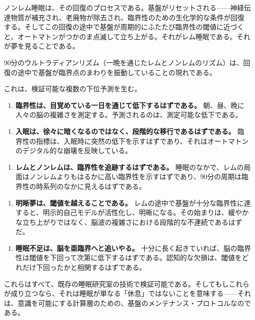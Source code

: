 \documentclass[11pt, twoside, openright]{book}
\begin{document}
ノンレム睡眠は、その回復のプロセスである。基盤がリセットされる------神経伝達物質が補充され、老廃物が除去され、臨界性のための生化学的な条件が回復する。そしてこの回復の途中で基盤が周期的にふたたび臨界性の閾値に近づくと、オートマトンがつかのま点滅して立ち上がる。それがレム睡眠である。それが夢を見ることである。

90分のウルトラディアンリズム（一晩を通じたレムとノンレムのリズム）は、回復の途中で基盤が臨界点のまわりを振動していることの現れである。

これは、検証可能な複数の下位予測を生む。

\begin{enumerate}
  \item \textbf{臨界性は、目覚めている一日を通じて低下するはずである。} 朝、昼、晩に人々の脳の複雑さを測定する。予測されるのは、測定可能な低下である。
\end{enumerate}

\begin{enumerate}
  \item \textbf{入眠は、徐々に暗くなるのではなく、段階的な移行であるはずである。} 臨界性の指標は、入眠時に突然の低下を示すはずであり、それはオートマトンのデジタル的な崩壊を反映している。
\end{enumerate}

\begin{enumerate}
  \item \textbf{レムとノンレムは、臨界性を追跡するはずである。} 睡眠のなかで、レムの局面はノンレムよりもはるかに高い臨界性を示すはずであり、90分の周期は臨界性の時系列のなかに見えるはずである。
\end{enumerate}

\begin{enumerate}
  \item \textbf{明晰夢は、閾値を越えることである。} レムの途中で基盤が十分な臨界性に達すると、明示的自己モデルが活性化し、明晰になる。その始まりは、緩やかな立ち上がりではなく、脳波の複雑さにおける段階的な不連続であるはずだ。
\end{enumerate}

\begin{enumerate}
  \item \textbf{睡眠不足は、脳を亜臨界へと追いやる。} 十分に長く起きていれば、脳の臨界性は閾値を下回って次第に低下するはずである。認知的な欠損は、閾値をどれだけ下回ったかと相関するはずである。
\end{enumerate}

これらはすべて、既存の睡眠研究室の技術で検証可能である。そしてもしこれらが成り立つなら、それは睡眠が単なる「休息」ではないことを意味する------それは、意識を可能にする計算層のための、基盤のメンテナンス・プロトコルなのである。
\end{document}
